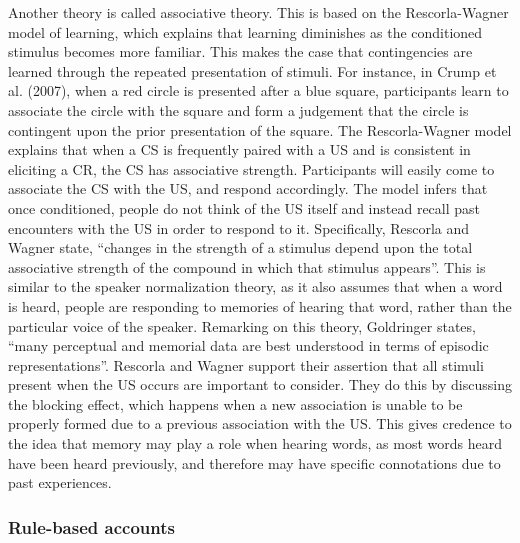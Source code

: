 \documentclass[
  english,
  man,floatsintext]{apa6}
\begin{document}
Another theory is called associative theory. This is based on the Rescorla-Wagner model of learning, which explains that learning diminishes as the conditioned stimulus becomes more familiar. This makes the case that contingencies are learned through the repeated presentation of stimuli. For instance, in Crump et al. (2007), when a red circle is presented after a blue square, participants learn to associate the circle with the square and form a judgement that the circle is contingent upon the prior presentation of the square. The Rescorla-Wagner model explains that when a CS is frequently paired with a US and is consistent in eliciting a CR, the CS has associative strength. Participants will easily come to associate the CS with the US, and respond accordingly. The model infers that once conditioned, people do not think of the US itself and instead recall past encounters with the US in order to respond to it. Specifically, Rescorla and Wagner state, \enquote{changes in the strength of a stimulus depend upon the total associative strength of the compound in which that stimulus appears}. This is similar to the speaker normalization theory, as it also assumes that when a word is heard, people are responding to memories of hearing that word, rather than the particular voice of the speaker. Remarking on this theory, Goldringer states, \enquote{many perceptual and memorial data are best understood in terms of episodic representations}. Rescorla and Wagner support their assertion that all stimuli present when the US occurs are important to consider. They do this by discussing the blocking effect, which happens when a new association is unable to be properly formed due to a previous association with the US. This gives credence to the idea that memory may play a role when hearing words, as most words heard have been heard previously, and therefore may have specific connotations due to past experiences.

\hypertarget{rule-based-accounts}{%
\subsubsection{Rule-based accounts}\label{rule-based-accounts}}
\end{document}
